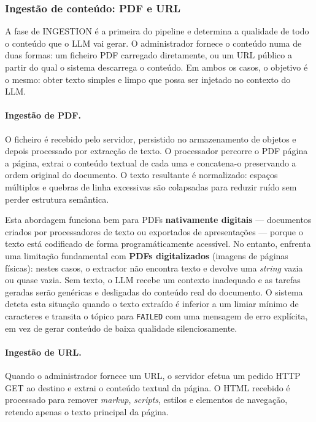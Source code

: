 \subsubsection{Ingest\~ao de conte\'udo: PDF e URL}
\label{sssec:ingestion}

A fase de INGESTION \'e a primeira do pipeline e determina a qualidade de
todo o conte\'udo que o LLM vai gerar. O administrador fornece o conte\'udo
numa de duas formas: um ficheiro PDF carregado diretamente, ou um URL
p\'ublico a partir do qual o sistema descarrega o conte\'udo. Em ambos os
casos, o objetivo \'e o mesmo: obter texto simples e limpo que possa ser
injetado no contexto do LLM.

\paragraph{Ingest\~ao de PDF.}
O ficheiro \'e recebido pelo servidor, persistido no armazenamento de
objetos e depois processado por extrac\c{c}\~ao de texto. O processador
percorre o PDF p\'agina a p\'agina, extrai o conte\'udo textual de cada uma
e concatena-o preservando a ordem original do documento. O texto resultante
\'e normalizado: espa\c{c}os m\'ultiplos e quebras de linha excessivas s\~ao
colapsadas para reduzir ru\'ido sem perder estrutura sem\^antica.

Esta abordagem funciona bem para PDFs \textbf{nativamente digitais} ---
documentos criados por processadores de texto ou exportados de apresenta\c{c}\~oes
---  porque o texto est\'a codificado de forma program\'aticamente acess\'ivel.
No entanto, enfrenta uma limita\c{c}\~ao fundamental com \textbf{PDFs
digitalizados} (imagens de p\'aginas f\'isicas): nestes casos, o extractor
n\~ao encontra texto e devolve uma \emph{string} vazia ou quase vazia.
Sem texto, o LLM recebe um contexto inadequado e as tarefas geradas ser\~ao
gen\'ericas e desligadas do conte\'udo real do documento. O sistema deteta
esta situa\c{c}\~ao quando o texto extra\'ido \'e inferior a um limiar m\'inimo
de caracteres e transita o t\'opico para \texttt{FAILED} com uma mensagem de
erro expl\'icita, em vez de gerar conte\'udo de baixa qualidade silenciosamente.

\paragraph{Ingest\~ao de URL.}
Quando o administrador fornece um URL, o servidor efetua um pedido HTTP GET
ao destino e extrai o conte\'udo textual da p\'agina. O HTML recebido \'e
processado para remover \emph{markup}, \emph{scripts}, estilos e elementos
de navega\c{c}\~ao, retendo apenas o texto principal da p\'agina.

